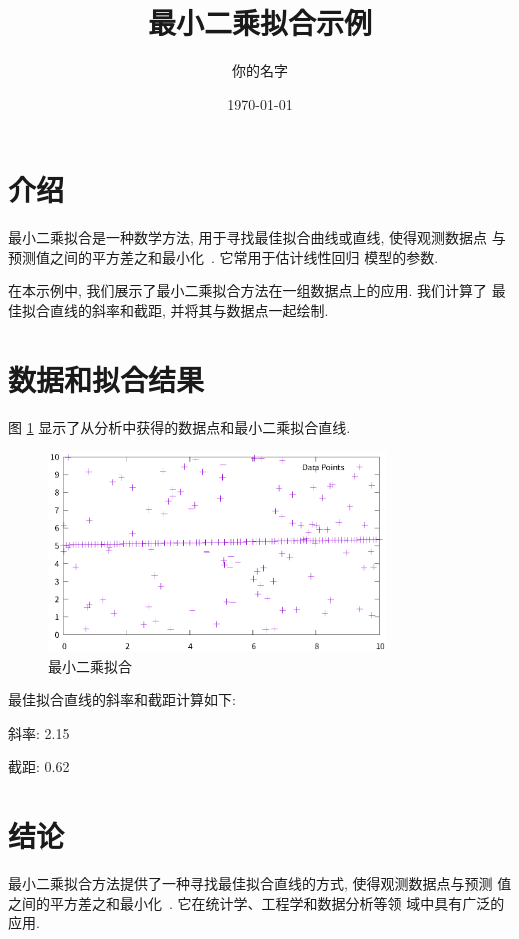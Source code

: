 \documentclass[a4paper]{article}
\begin{document}
\title{最小二乘拟合示例}
\author{你的名字}
\date{\today}
\maketitle

\section{介绍}

最小二乘拟合是一种数学方法, 用于寻找最佳拟合曲线或直线, 使得观测数据点
与预测值之间的平方差之和最小化~\cite{ref1,ref2}. 它常用于估计线性回归
模型的参数.

在本示例中, 我们展示了最小二乘拟合方法在一组数据点上的应用. 我们计算了
最佳拟合直线的斜率和截距, 并将其与数据点一起绘制.

\section{数据和拟合结果}

图 \ref{fig:fitting} 显示了从分析中获得的数据点和最小二乘拟合直线.

\begin{figure}[htbp]
    \centering
    \includegraphics[width=0.8\textwidth]{output.eps}
    \caption{最小二乘拟合}
    \label{fig:fitting}
\end{figure}

最佳拟合直线的斜率和截距计算如下:

\noindent 斜率: 2.15

\noindent 截距: 0.62

\section{结论}

最小二乘拟合方法提供了一种寻找最佳拟合直线的方式, 使得观测数据点与预测
值之间的平方差之和最小化~\cite{ref1}. 它在统计学、工程学和数据分析等领
域中具有广泛的应用.



\end{document}
